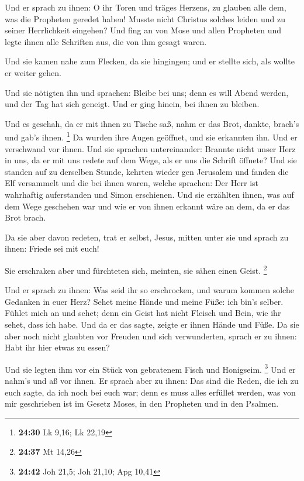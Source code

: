  Und er sprach zu ihnen: O ihr Toren und träges Herzens, zu
glauben alle dem, was die Propheten geredet haben!  Musste
nicht Christus solches leiden und zu seiner Herrlichkeit eingehen?
 Und fing an von Mose und allen Propheten und legte ihnen
alle Schriften aus, die von ihm gesagt waren.

 Und sie kamen nahe zum Flecken, da sie hingingen; und er
stellte sich, als wollte er weiter gehen.

 Und sie nötigten ihn und sprachen: Bleibe bei uns; denn es
will Abend werden, und der Tag hat sich geneigt. Und er ging hinein, bei
ihnen zu bleiben.

 Und es geschah, da er mit ihnen zu Tische saß, nahm er das
Brot, dankte, brach's und gab's ihnen. \footnote{\textbf{24:30} Lk 9,16;
  Lk 22,19}  Da wurden ihre Augen geöffnet, und sie
erkannten ihn. Und er verschwand vor ihnen.  Und sie
sprachen untereinander: Brannte nicht unser Herz in uns, da er mit uns
redete auf dem Wege, als er uns die Schrift öffnete?  Und
sie standen auf zu derselben Stunde, kehrten wieder gen Jerusalem und
fanden die Elf versammelt und die bei ihnen waren,  welche
sprachen: Der Herr ist wahrhaftig auferstanden und Simon erschienen.
 Und sie erzählten ihnen, was auf dem Wege geschehen war
und wie er von ihnen erkannt wäre an dem, da er das Brot brach.

 Da sie aber davon redeten, trat er selbst, Jesus, mitten
unter sie und sprach zu ihnen: Friede sei mit euch!

 Sie erschraken aber und fürchteten sich, meinten, sie
sähen einen Geist. \footnote{\textbf{24:37} Mt 14,26}

 Und er sprach zu ihnen: Was seid ihr so erschrocken, und
warum kommen solche Gedanken in euer Herz?  Sehet meine
Hände und meine Füße: ich bin's selber. Fühlet mich an und sehet; denn
ein Geist hat nicht Fleisch und Bein, wie ihr sehet, dass ich habe.
 Und da er das sagte, zeigte er ihnen Hände und Füße.
 Da sie aber noch nicht glaubten vor Freuden und sich
verwunderten, sprach er zu ihnen: Habt ihr hier etwas zu essen?

 Und sie legten ihm vor ein Stück von gebratenem Fisch und
Honigseim. \footnote{\textbf{24:42} Joh 21,5; Joh 21,10; Apg 10,41}
 Und er nahm's und aß vor ihnen.  Er sprach
aber zu ihnen: Das sind die Reden, die ich zu euch sagte, da ich noch
bei euch war; denn es muss alles erfüllet werden, was von mir
geschrieben ist im Gesetz Moses, in den Propheten und in den Psalmen.

